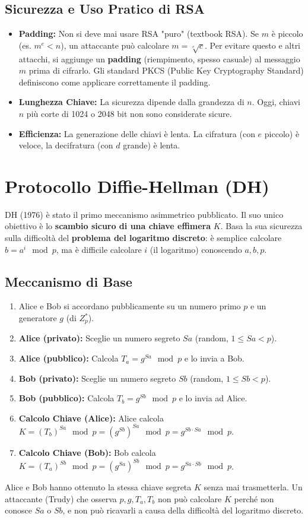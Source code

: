 \documentclass[../main.tex]{subfiles}
\begin{document}
\subsection{Sicurezza e Uso Pratico di RSA}
\begin{itemize}
    \item \textbf{Padding:} Non si deve mai usare RSA "puro" (textbook RSA). Se $m$ è piccolo (es. $m^e < n$), un attaccante può calcolare $m = \sqrt[e]{c}$. Per evitare questo e altri attacchi, si aggiunge un \textbf{padding} (riempimento, spesso casuale) al messaggio $m$ prima di cifrarlo. Gli standard PKCS (Public Key Cryptography Standard) definiscono come applicare correttamente il padding.
    \item \textbf{Lunghezza Chiave:} La sicurezza dipende dalla grandezza di $n$. Oggi, chiavi $n$ più corte di 1024 o 2048 bit non sono considerate sicure.
    \item \textbf{Efficienza:} La generazione delle chiavi è lenta. La cifratura (con $e$ piccolo) è veloce, la decifratura (con $d$ grande) è lenta.
\end{itemize}

\section{Protocollo Diffie-Hellman (DH)}
DH (1976) è stato il primo meccanismo asimmetrico pubblicato. Il suo unico obiettivo è lo \textbf{scambio sicuro di una chiave effimera} $K$.
Basa la sua sicurezza sulla difficoltà del \textbf{problema del logaritmo discreto}: è semplice calcolare $b = a^i \mod p$, ma è difficile calcolare $i$ (il logaritmo) conoscendo $a, b, p$.

\subsection{Meccanismo di Base}
\begin{enumerate}
    \item Alice e Bob si accordano pubblicamente su un numero primo $p$ e un generatore $g$ (di $Z_p^*$).
    \item \textbf{Alice (privato):} Sceglie un numero segreto $Sa$ (random, $1 \le Sa < p$).
    \item \textbf{Alice (pubblico):} Calcola $T_a = g^{Sa} \mod p$ e lo invia a Bob.
    \item \textbf{Bob (privato):} Sceglie un numero segreto $Sb$ (random, $1 \le Sb < p$).
    \item \textbf{Bob (pubblico):} Calcola $T_b = g^{Sb} \mod p$ e lo invia ad Alice.
    \item \textbf{Calcolo Chiave (Alice):} Alice calcola $K = (T_b)^{Sa} \mod p = (g^{Sb})^{Sa} \mod p = g^{Sb \cdot Sa} \mod p$.
    \item \textbf{Calcolo Chiave (Bob):} Bob calcola $K = (T_a)^{Sb} \mod p = (g^{Sa})^{Sb} \mod p = g^{Sa \cdot Sb} \mod p$.
\end{enumerate}
Alice e Bob hanno ottenuto la stessa chiave segreta $K$ senza mai trasmetterla. Un attaccante (Trudy) che osserva $p, g, T_a, T_b$ non può calcolare $K$ perché non conosce $Sa$ o $Sb$, e non può ricavarli a causa della difficoltà del logaritmo discreto.
\end{document}
